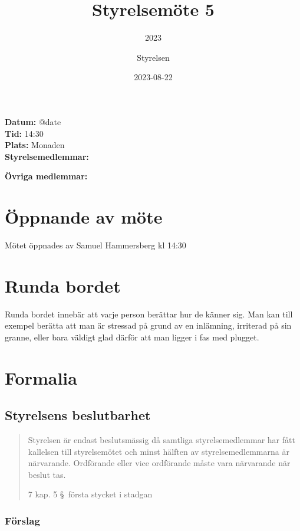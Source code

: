 \documentclass[protokoll]{dvd}
\begin{document}
\title{Styrelsemöte 5}
\subtitle{2023}
\author{Styrelsen}
\date{2023-08-22}


\textbf{Datum:} \csname @date\endcsname\\
\textbf{Tid:} 14:30\\
\textbf{Plats:} Monaden\\
\textbf{Styrelsemedlemmar:}
\begin{närvarande_förtroendevalda}
\end{närvarande_förtroendevalda}

\textbf{Övriga medlemmar:} \\


\section{Öppnande av möte}

Mötet öppnades av Samuel Hammersberg kl 14:30

\section{Runda bordet}

Runda bordet innebär att varje person berättar hur de känner sig.
Man kan till exempel berätta att man är stressad på grund av en inlämning, irriterad på sin granne, eller bara väldigt glad därför att man ligger i fas med plugget.

\section{Formalia}

\subsection{Styrelsens beslutbarhet}

\blockquote[7 kap. 5 \S~första stycket i stadgan][]{%
    Styrelsen är endast beslutsmässig då samtliga styrelsemedlemmar har fått kallelsen till styrelsemötet och minst hälften av styrelsemedlemmarna är närvarande.
    Ordförande eller vice ordförande måste vara närvarande när beslut tas.
}

\subsubsection*{Förslag}
\end{document}
